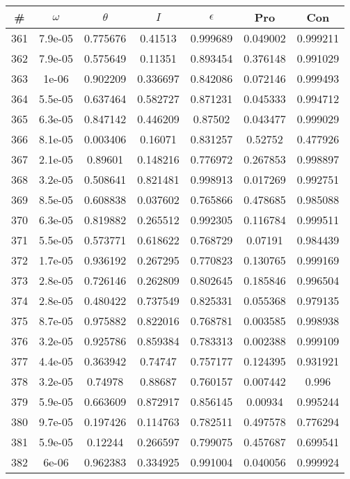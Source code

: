 \newpage
\begin{table}
\begin{tabular}{c|c|c|c|c|c|c}
\# & $\omega$ & $\theta$ & $I$ & $\epsilon$ & Pro & Con\\
\hline
361 & 7.9e-05 & 0.775676 & 0.41513 & 0.999689 & 0.049002 & 0.999211\\
362 & 7.9e-05 & 0.575649 & 0.11351 & 0.893454 & 0.376148 & 0.991029\\
363 & 1e-06 & 0.902209 & 0.336697 & 0.842086 & 0.072146 & 0.999493\\
364 & 5.5e-05 & 0.637464 & 0.582727 & 0.871231 & 0.045333 & 0.994712\\
365 & 6.3e-05 & 0.847142 & 0.446209 & 0.87502 & 0.043477 & 0.999029\\
366 & 8.1e-05 & 0.003406 & 0.16071 & 0.831257 & 0.52752 & 0.477926\\
367 & 2.1e-05 & 0.89601 & 0.148216 & 0.776972 & 0.267853 & 0.998897\\
368 & 3.2e-05 & 0.508641 & 0.821481 & 0.998913 & 0.017269 & 0.992751\\
369 & 8.5e-05 & 0.608838 & 0.037602 & 0.765866 & 0.478685 & 0.985088\\
370 & 6.3e-05 & 0.819882 & 0.265512 & 0.992305 & 0.116784 & 0.999511\\
371 & 5.5e-05 & 0.573771 & 0.618622 & 0.768729 & 0.07191 & 0.984439\\
372 & 1.7e-05 & 0.936192 & 0.267295 & 0.770823 & 0.130765 & 0.999169\\
373 & 2.8e-05 & 0.726146 & 0.262809 & 0.802645 & 0.185846 & 0.996504\\
374 & 2.8e-05 & 0.480422 & 0.737549 & 0.825331 & 0.055368 & 0.979135\\
375 & 8.7e-05 & 0.975882 & 0.822016 & 0.768781 & 0.003585 & 0.998938\\
376 & 3.2e-05 & 0.925786 & 0.859384 & 0.783313 & 0.002388 & 0.999109\\
377 & 4.4e-05 & 0.363942 & 0.74747 & 0.757177 & 0.124395 & 0.931921\\
378 & 3.2e-05 & 0.74978 & 0.88687 & 0.760157 & 0.007442 & 0.996\\
379 & 5.9e-05 & 0.663609 & 0.872917 & 0.856145 & 0.00934 & 0.995244\\
380 & 9.7e-05 & 0.197426 & 0.114763 & 0.782511 & 0.497578 & 0.776294\\
381 & 5.9e-05 & 0.12244 & 0.266597 & 0.799075 & 0.457687 & 0.699541\\
382 & 6e-06 & 0.962383 & 0.334925 & 0.991004 & 0.040056 & 0.999924\\

\end{tabular}
\end{table}
